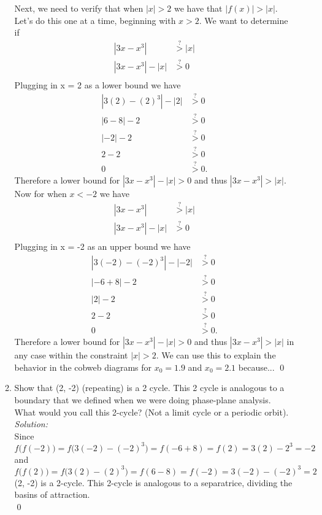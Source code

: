 \documentclass[10pt]{amsart}
\theoremstyle{nonumberplain}
\begin{document}
\begin{enumerate}[label={\bf {\arabic*}:}]
\begin{enumerate}
Next, we need to verify that when $|x| > 2$ we have that $|f(x)| > |x|$.
Let's do this one at a time, beginning with $x > 2$.
We want to determine if
\begin{align*}
|3x - x^3| &\overset{?}> |x| \\
|3x - x^3| - |x| &\overset{?}> 0 \\
\end{align*}
Plugging in x = 2 as a lower bound we have
\begin{align*}
|3(2) - (2)^3| - |2| &\overset{?}> 0 \\
|6 - 8| - 2 &\overset{?}> 0 \\
|-2| - 2 &\overset{?}> 0 \\
2 - 2 &\overset{?}> 0 \\
0 &\overset{?}> 0.
\end{align*}
Therefore a lower bound for $|3x - x^3| - |x| > 0$ and thus $|3x - x^3| > |x|$.
Now for when $x < -2$ we have
\begin{align*}
|3x - x^3| &\overset{?}> |x| \\
|3x - x^3| - |x| &\overset{?}> 0 \\
\end{align*}
Plugging in x = -2 as an upper bound we have
\begin{align*}
|3(-2) - (-2)^3| - |-2| &\overset{?}> 0 \\
|-6 + 8| - 2 &\overset{?}> 0 \\
|2| - 2 &\overset{?}> 0 \\
2 - 2 &\overset{?}> 0 \\
0 &\overset{?}> 0.
\end{align*}
Therefore a lower bound for $|3x - x^3| - |x| > 0$ and thus $|3x - x^3| > |x|$ in any case within the constraint $|x| > 2$.
We can use this to explain the behavior in the cobweb diagrams for $x_0 = 1.9$ and $x_0 = 2.1$ because...
\qed \\


\item Show that (2, -2) (repeating) is a 2 cycle.
This 2 cycle is analogous to a boundary that we defined when we were doing phase-plane analysis.
What would you call this 2-cycle? (Not a limit cycle or a periodic orbit). \\

\textit{Solution:} \\
Since
$$f\Big(f(-2)\Big) = f\Big(3(-2) - (-2)^3\Big) = f(-6 + 8) = f(2) = 3(2) - 2^3 = -2$$
and
$$f\Big(f(2)\Big) = f\Big(3(2) - (2)^3\Big) = f(6 - 8) = f(-2) = 3(-2) - (-2)^3 = 2$$
(2, -2) is a 2-cycle.
This 2-cycle is analogous to a separatrice, dividing the basins of attraction. \\
\qed \\
\newpage


\end{enumerate}
\end{enumerate}
\end{document}
